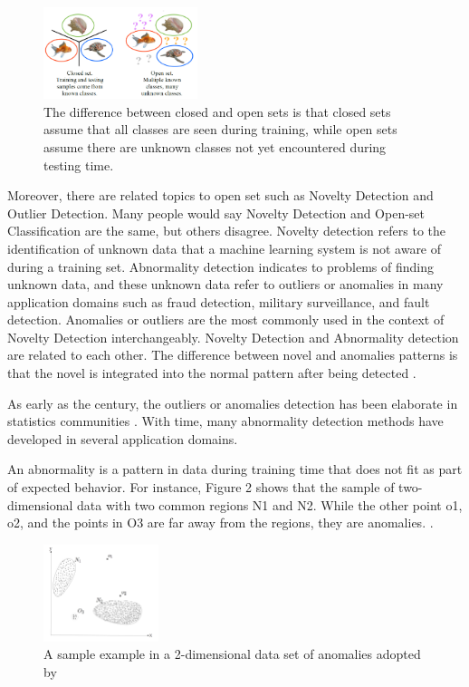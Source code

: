 \documentclass[conference]{IEEEtran}
\begin{document}
\begin{figure}[h!]
\centering
\includegraphics[width=0.4\textwidth]{soso.PNG}
\caption{\label{fig:Capture-suad} The difference between closed and open sets is that closed sets assume that all classes are seen during training, while open sets assume there are unknown classes not yet encountered during testing time.}
\end{figure}


\par Moreover, there are related topics to open set such as Novelty Detection and Outlier Detection. Many people would say Novelty Detection and Open-set Classification are the same, but others disagree. Novelty detection refers to the identification of unknown data that a machine learning system is not aware of during a training set. Abnormality detection indicates to problems of finding unknown data, and these unknown data refer to outliers or anomalies in many application domains such as fraud detection, military surveillance, and fault detection.  Anomalies or outliers are the most commonly used in the context of Novelty Detection interchangeably. Novelty Detection \cite{markou2003novelty} \cite{markou2003novelty} and Abnormality detection \cite{chandola2009anomaly} are related to each other. The difference between novel and anomalies patterns is that the novel is integrated into the normal pattern after being detected \cite{chandola2009anomaly}.

\par As early as the  century, the outliers or anomalies detection has been elaborate in statistics communities \cite{edgeworth1887xli}. With time, many abnormality detection methods have developed in several application domains.


\par An abnormality is a pattern in data during training time that does not fit as part of expected behavior. For instance, Figure 2 shows that the sample of two-dimensional data with two common regions N1 and N2. While the other point o1, o2, and the points in O3   are far away from the regions, they are anomalies. \cite{chandola2009anomaly}.

\begin{figure}[h!]
\centering
\includegraphics[width=0.3\textwidth]{11.png}
\caption{\label{fig:Capture-suad}   A sample example in a 2-dimensional data set of anomalies adopted by \cite{chandola2009anomaly}}
\end{figure}
\end{document}
